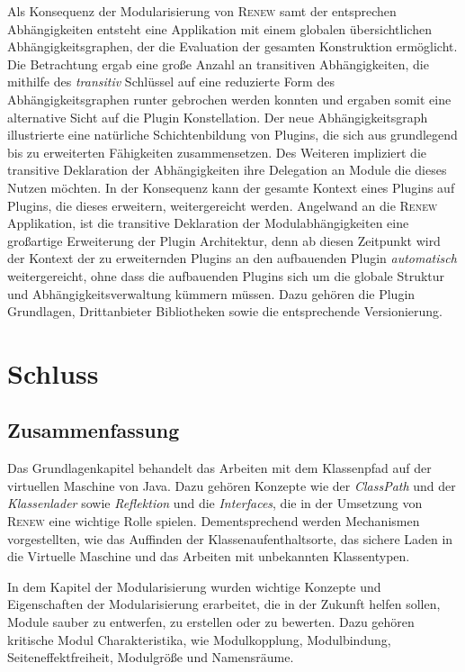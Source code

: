 Als Konsequenz der Modularisierung von \textsc{Renew} samt der entsprechen Abhängigkeiten entsteht eine Applikation mit einem globalen übersichtlichen Abhängigkeitsgraphen, der die Evaluation der gesamten Konstruktion ermöglicht. Die Betrachtung ergab eine große Anzahl an transitiven Abhängigkeiten, die mithilfe des \textit{transitiv} Schlüssel auf eine reduzierte Form des Abhängigkeitsgraphen runter gebrochen werden konnten und ergaben somit eine alternative Sicht auf die Plugin Konstellation. Der neue Abhängigkeitsgraph illustrierte eine natürliche Schichtenbildung von Plugins, die sich aus grundlegend bis zu erweiterten Fähigkeiten zusammensetzen. Des Weiteren impliziert die transitive Deklaration der Abhängigkeiten ihre Delegation an Module die dieses Nutzen möchten. In der Konsequenz kann der gesamte Kontext eines Plugins auf Plugins, die dieses erweitern, weitergereicht werden. \newline
Angelwand an die \textsc{Renew} Applikation, ist die transitive Deklaration der Modulabhängigkeiten eine großartige Erweiterung der Plugin Architektur, denn ab diesen Zeitpunkt wird der Kontext der zu erweiternden Plugins an den aufbauenden Plugin \textit{automatisch} weitergereicht, ohne dass die aufbauenden Plugins sich um die globale Struktur und Abhängigkeitsverwaltung kümmern müssen. Dazu gehören die Plugin Grundlagen, Drittanbieter Bibliotheken sowie die entsprechende Versionierung. \newline



\chapter{Schluss}


\section{Zusammenfassung}

Das Grundlagenkapitel behandelt das Arbeiten mit dem Klassenpfad auf der virtuellen Maschine von Java. Dazu gehören Konzepte wie der \textit{ClassPath} und der \textit{Klassenlader} sowie \textit{Reflektion} und die \textit{Interfaces}, die in der Umsetzung von \textsc{Renew} eine wichtige Rolle spielen. Dementsprechend werden Mechanismen vorgestellten, wie das Auffinden der Klassenaufenthaltsorte, das sichere Laden in die Virtuelle Maschine und das Arbeiten mit unbekannten Klassentypen.\bigbreak

In dem Kapitel der Modularisierung wurden wichtige Konzepte und Eigenschaften der Modularisierung erarbeitet, die in der Zukunft helfen sollen, Module sauber zu entwerfen, zu erstellen oder zu bewerten. Dazu gehören kritische Modul Charakteristika, wie Modulkopplung, Modulbindung, Seiteneffektfreiheit, Modulgröße und Namensräume. \bigbreak

